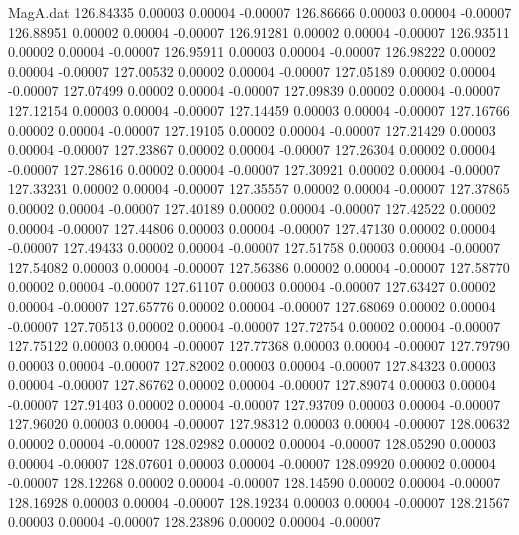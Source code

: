 \begin{filecontents}{MagA.dat}
 126.84335    0.00003    0.00004   -0.00007
 126.86666    0.00003    0.00004   -0.00007
 126.88951    0.00002    0.00004   -0.00007
 126.91281    0.00002    0.00004   -0.00007
 126.93511    0.00002    0.00004   -0.00007
 126.95911    0.00003    0.00004   -0.00007
 126.98222    0.00002    0.00004   -0.00007
 127.00532    0.00002    0.00004   -0.00007
 127.05189    0.00002    0.00004   -0.00007
 127.07499    0.00002    0.00004   -0.00007
 127.09839    0.00002    0.00004   -0.00007
 127.12154    0.00003    0.00004   -0.00007
 127.14459    0.00003    0.00004   -0.00007
 127.16766    0.00002    0.00004   -0.00007
 127.19105    0.00002    0.00004   -0.00007
 127.21429    0.00003    0.00004   -0.00007
 127.23867    0.00002    0.00004   -0.00007
 127.26304    0.00002    0.00004   -0.00007
 127.28616    0.00002    0.00004   -0.00007
 127.30921    0.00002    0.00004   -0.00007
 127.33231    0.00002    0.00004   -0.00007
 127.35557    0.00002    0.00004   -0.00007
 127.37865    0.00002    0.00004   -0.00007
 127.40189    0.00002    0.00004   -0.00007
 127.42522    0.00002    0.00004   -0.00007
 127.44806    0.00003    0.00004   -0.00007
 127.47130    0.00002    0.00004   -0.00007
 127.49433    0.00002    0.00004   -0.00007
 127.51758    0.00003    0.00004   -0.00007
 127.54082    0.00003    0.00004   -0.00007
 127.56386    0.00002    0.00004   -0.00007
 127.58770    0.00002    0.00004   -0.00007
 127.61107    0.00003    0.00004   -0.00007
 127.63427    0.00002    0.00004   -0.00007
 127.65776    0.00002    0.00004   -0.00007
 127.68069    0.00002    0.00004   -0.00007
 127.70513    0.00002    0.00004   -0.00007
 127.72754    0.00002    0.00004   -0.00007
 127.75122    0.00003    0.00004   -0.00007
 127.77368    0.00003    0.00004   -0.00007
 127.79790    0.00003    0.00004   -0.00007
 127.82002    0.00003    0.00004   -0.00007
 127.84323    0.00003    0.00004   -0.00007
 127.86762    0.00002    0.00004   -0.00007
 127.89074    0.00003    0.00004   -0.00007
 127.91403    0.00002    0.00004   -0.00007
 127.93709    0.00003    0.00004   -0.00007
 127.96020    0.00003    0.00004   -0.00007
 127.98312    0.00003    0.00004   -0.00007
 128.00632    0.00002    0.00004   -0.00007
 128.02982    0.00002    0.00004   -0.00007
 128.05290    0.00003    0.00004   -0.00007
 128.07601    0.00003    0.00004   -0.00007
 128.09920    0.00002    0.00004   -0.00007
 128.12268    0.00002    0.00004   -0.00007
 128.14590    0.00002    0.00004   -0.00007
 128.16928    0.00003    0.00004   -0.00007
 128.19234    0.00003    0.00004   -0.00007
 128.21567    0.00003    0.00004   -0.00007
 128.23896    0.00002    0.00004   -0.00007

\end{filecontents}
